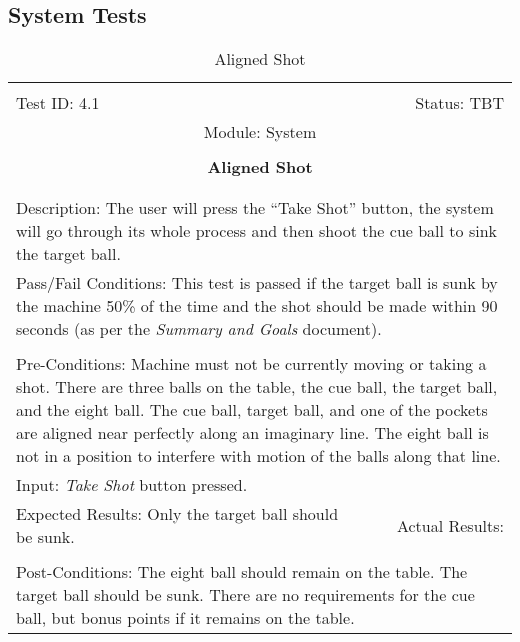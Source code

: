 \documentclass[titlepage]{article}
\begin{document}
\subsection{System Tests}
\begin{center}%
\begin{table}[h!]
\begin{tabular}{|l r|}\hline&\\[-2mm]
	Test ID: 4.1	&Status: TBT\\[-3mm]
	\multicolumn{2}{|c|}{Module: System}\\&\\
	\multicolumn{2}{|c|}{\textbf{\large{Aligned Shot}}}\\&\\\hline&\\[-3mm]
	\multicolumn{2}{|p{\textwidth}|}{Description: The user will press the ``Take Shot'' button, the system will go through its whole process and then shoot the cue ball to sink the target ball.}\\\hline
	\multicolumn{2}{|p{\textwidth}|}{Pass/Fail Conditions: This test is passed if the target ball is sunk by the machine 50\% of the time and the shot should be made within 90 seconds (as per the \textit{Summary and Goals} document).}\\[1mm]\hline&\\[-3mm]
	\multicolumn{2}{|p{\textwidth}|}{Pre-Conditions: Machine must not be currently moving or taking a shot. There are three balls on the table, the cue ball, the target ball, and the eight ball. The cue ball, target ball, and one of the pockets are aligned near perfectly along an imaginary line. The eight ball is not in a position to interfere with motion of the balls along that line.}\\[4mm]
	\multicolumn{2}{|p{\textwidth}|}{Input: \textit{Take Shot} button pressed.}\\[2mm]\hline
	\multicolumn{1}{|p{0.49\textwidth}}{Expected Results: Only the target ball should be sunk.}	&\multicolumn{1}{|p{0.45\textwidth}|}{Actual Results: }\\\hline&\\[-3mm]
	\multicolumn{2}{|p{\textwidth}|}{Post-Conditions: The eight ball should remain on the table. The target ball should be sunk. There are no requirements for the cue ball, but bonus points if it remains on the table.}\\\hline
\end{tabular}
\caption{Aligned Shot}
\end{table}
\end{center}
\end{document}
